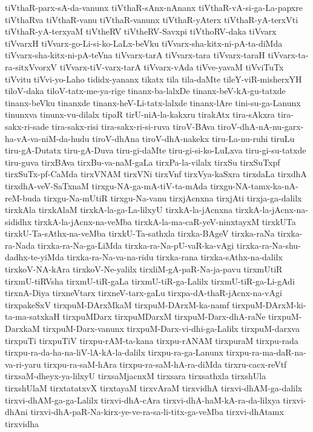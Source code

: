 {tiVthaR-parx-sA-da-vanunx
tiVthaR-sAnx-nAnanx
tiVthaR-vA-si-ga-La-papxre
tiVthaRva
tiVthaR-vanu
tiVthaR-vanunx
tiVthaR-yAterx
tiVthaR-yA-terxVti
tiVthaR-yA-terxyaM
tiVtheRV
tiVtheRV-Savxpi
tiVthoRV-daka
tiVvarx
tiVvarxH
tiVvarx-go-Li-si-ko-LaLx-beVku
tiVvarx-sha-kitx-ni-pA-ta-diMda
tiVvarx-sha-kitx-ni-pA-teVna
tiVvarx-tarA
tiVvarx-tara
tiVvarx-taraH
tiVvarx-ta-ra-sitxVvorxV
tiVvarx-tiV-varx-tarA
tiVvarx-vAda
tiVve-yavaM
tiVviTuTx
tiVvitu
tiVvi-yo-Laho
tididx-yananx
tikatx
tila
tila-daMte
tileY-viR-misherxYH
tiloV-daka
tiloV-tatx-me-ya-rige
tinanx-ba-lalxDe
tinanx-beV-kA-gu-tatxde
tinanx-beVku
tinanxde
tinanx-heV-Li-tatx-lalxde
tinanx-lAre
tini-su-ga-Lanunx
tinunxva
tinunx-vu-dilalx
tipaR
tirU-niA-la-kakxru
tirakAtx
tira-sAkxra
tira-sakx-ri-sade
tira-sakx-risi
tira-sakx-ri-si-ruva
tiroV-BAva
tiroV-dhA-nA-nu-garx-ha-vA-va-niM-da-hudu
tiroV-dhAna
tiroV-dhA-nakekx
tiru-La-nu-ruhi
tiruLu
tiru-gA-Dutatx
tiru-gA-Duva
tiru-gi-daMte
tiru-gi-si-ko-LuLxva
tiru-gi-su-tatxde
tiru-guva
tirxBAva
tirxBu-va-naM-gaLa
tirxPa-la-vilalx
tirxSu
tirxSuTxpf
tirxSuTx-pf-CaMda
tirxVNAM
tirxVNi
tirxVnf
tirxVya-kaSxra
tirxdaLa
tirxdhA
tirxdhA-veV-SaTxnaM
tirxgu-NA-ga-mA-tiV-ta-mAda
tirxgu-NA-tamx-ka-nA-reM-buda
tirxgu-Na-mUtiR
tirxgu-Na-vanu
tirxjAcnxna
tirxjAti
tirxja-ga-dalilx
tirxkAla
tirxkAlaM
tirxkA-la-ga-La-lilxyU
tirxkA-la-jAcnxna
tirxkA-la-jAcnx-na-sididhx
tirxkA-la-jAcnx-na-veMba
tirxkA-la-ma-caR-yeV-ninxtayxM
tirxkUTa
tirxkU-Ta-sAthx-na-veMba
tirxkU-Ta-sathxla
tirxka-BAgeV
tirxka-raNa
tirxka-ra-Nada
tirxka-ra-Na-ga-LiMda
tirxka-ra-Na-pU-vaR-ka-vAgi
tirxka-ra-Na-shu-dadhx-te-yiMda
tirxka-ra-Na-va-na-ridu
tirxka-rana
tirxka-sAthx-na-dalilx
tirxkoV-NA-kAra
tirxkoV-Ne-yalilx
tirxliM-gA-paR-Na-ja-pavu
tirxmUtiR
tirxmU-tiRVsha
tirxmU-tiR-gaLa
tirxmU-tiR-ga-Lalilx
tirxmU-tiR-ga-Li-gAdi
tirxnA-Diya
tirxneVtarx
tirxneV-tarx-gaLu
tirxpa-dA-thaR-jAcnx-na-vAgi
tirxpakeSxV
tirxpuM-DArxMkaM
tirxpuM-DArxM-ka-namf
tirxpuM-DArxM-ki-ta-ma-satxkaH
tirxpuMDarx
tirxpuMDarxM
tirxpuM-Darx-dhA-raNe
tirxpuM-DarxkaM
tirxpuM-Darx-vanunx
tirxpuM-Darx-vi-dhi-ga-Lalilx
tirxpuM-darxva
tirxpuTi
tirxpuTiV
tirxpu-rAM-ta-kana
tirxpu-rANAM
tirxpuraM
tirxpu-rada
tirxpu-ra-da-ha-na-liV-lA-kA-la-dalilx
tirxpu-ra-ga-Lanunx
tirxpu-ra-ma-daR-na-va-ri-yaru
tirxpu-ra-saM-hAra
tirxpu-ra-saM-hA-ra-diMda
tirxru-cacx-reVtf
tirxsaM-dheyx-ya-lilxyU
tirxsaMjacnxM
tirxsara
tirxsathxla
tirxshUla
tirxshUlaM
tirxtatatxvX
tirxtayaM
tirxvAraM
tirxvidhA
tirxvi-dhAM-ga-dalilx
tirxvi-dhAM-ga-ga-Lalilx
tirxvi-dhA-cAra
tirxvi-dhA-haM-kA-ra-da-lilxya
tirxvi-dhAni
tirxvi-dhA-paR-Na-kirx-ye-ve-ra-sa-li-titx-ga-veMba
tirxvi-dhAtamx
tirxvidha
}
